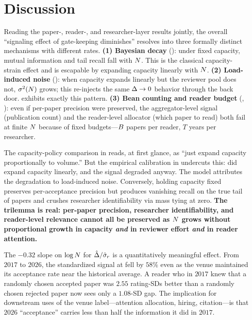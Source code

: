 \section{Discussion}
\label{sec:discussion}

 Reading the paper-, reader-, and researcher-layer results jointly, the overall ``signaling effect of gate-keeping diminishes'' resolves into three formally distinct mechanisms with different rates. {\bf (1) Bayesian decay} (): under fixed capacity, mutual information and tail recall fall with $N$. This is the classical capacity-strain effect and is escapable by expanding capacity linearly with $N$. {\bf (2) Load-induced noise} (): when capacity expands linearly but the reviewer pool does not, $\sigma^2(N)$ grows; this re-injects the same $\Delta \to 0$ behavior through the back door. \iclr exhibits exactly this pattern. {\bf (3) Bean counting and reader budget} (, ): even if per-paper precision were preserved, the aggregator-level signal (publication count) and the reader-level allocator (which paper to read) both fail at finite $N$ because of fixed budgets---$B$ papers per reader, $T$ years per researcher.

 The capacity-policy comparison in  reads, at first glance, as ``just expand capacity proportionally to volume.'' But the empirical \iclr calibration in  undercuts this: \iclr did expand capacity linearly, and the signal degraded anyway. The model attributes the degradation to load-induced noise. Conversely, holding capacity fixed preserves per-acceptance precision but produces vanishing recall on the true tail of papers and crushes researcher identifiability via mass tying at zero. {\bf The trilemma is real: per-paper precision, researcher identifiability, and reader-level relevance cannot all be preserved as $N$ grows without proportional growth in capacity \emph{and} in reviewer effort \emph{and} in reader attention.}

 The $-0.32$ slope on $\log N$ for $\hat{\Delta} / \hat{\sigma}_r$ is a quantitatively meaningful effect. From $2017$ to $2026$, the standardized signal at \iclr fell by $58\%$ even as the venue maintained its acceptance rate near the historical average. A reader who in $2017$ knew that a randomly chosen accepted paper was $2.55$ rating-SDs better than a randomly chosen rejected paper now sees only a $1.08$-SD gap. The implication for downstream uses of the venue label---attention allocation, hiring, citation---is that $2026$ \iclr ``acceptance'' carries less than half the information it did in $2017$.

